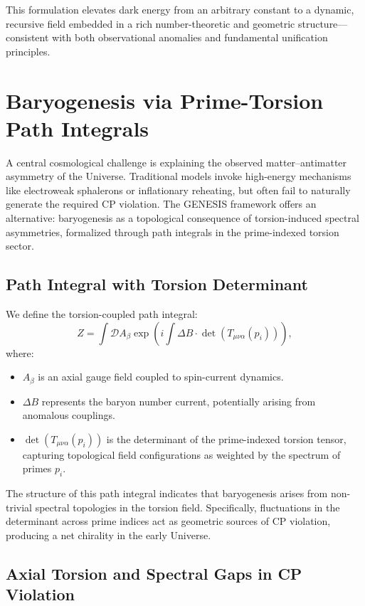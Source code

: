 \documentclass{article}
\theoremstyle{plain}
\begin{document}
This formulation elevates dark energy from an arbitrary constant to a dynamic, recursive field embedded in a rich number-theoretic and geometric structure—consistent with both observational anomalies and fundamental unification principles.

\section{Baryogenesis via Prime-Torsion Path Integrals}

A central cosmological challenge is explaining the observed matter–antimatter asymmetry of the Universe. Traditional models invoke high-energy mechanisms like electroweak sphalerons or inflationary reheating, but often fail to naturally generate the required CP violation. The GENESIS framework offers an alternative: baryogenesis as a topological consequence of torsion-induced spectral asymmetries, formalized through path integrals in the prime-indexed torsion sector.

\subsection{Path Integral with Torsion Determinant}

We define the torsion-coupled path integral:
\[
Z = \int \mathcal{D}A_\beta \exp\left(i \int \Delta B \cdot \det(T_{\mu\nu\alpha}(p_i))\right),
\]
where:
\begin{itemize}
    \item $A_\beta$ is an axial gauge field coupled to spin-current dynamics.
    \item $\Delta B$ represents the baryon number current, potentially arising from anomalous couplings.
    \item $\det(T_{\mu\nu\alpha}(p_i))$ is the determinant of the prime-indexed torsion tensor, capturing topological field configurations as weighted by the spectrum of primes $p_i$.
\end{itemize}

The structure of this path integral indicates that baryogenesis arises from non-trivial spectral topologies in the torsion field. Specifically, fluctuations in the determinant across prime indices act as geometric sources of CP violation, producing a net chirality in the early Universe.

\subsection{Axial Torsion and Spectral Gaps in CP Violation}
\end{document}
